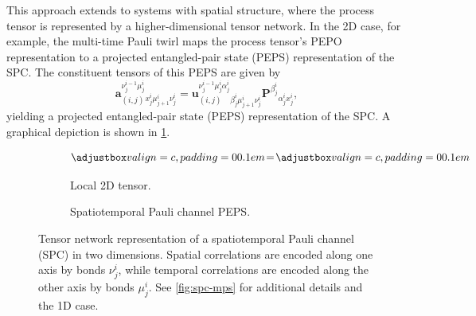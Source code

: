This approach extends to systems with spatial structure, where the process tensor is represented by a higher-dimensional tensor network. In the 2D case, for example, the multi-time Pauli twirl maps the process tensor's PEPO representation to a projected entangled-pair state (PEPS) representation of the SPC. The constituent tensors of this PEPS are given by
\begin{equation}
  \mathbf{a}_{(i, j)}^{\nu^{i-1}_j\mu_j^i}{}_{x_j^i\mu_{j+1}^i\nu_j^i} = 
  \mathbf{u}_{(i, j)}^{\nu^{i-1}_j\mu_j^i\alpha_j^i}{}_{\beta_j^i\mu_{j+1}^i\nu_j^i}
  \mathbf{P}^{\beta_j^i}{}_{\alpha_j^i x_j^i},
\end{equation}
yielding a projected entangled-pair state (PEPS) representation of the SPC. A graphical depiction is shown in \cref{fig:spc-peps}.
\begin{figure}
    \centering
    \begin{subfigure}{0.49\textwidth}
      \centering
      \[
      \valignbox{} 
      \!=\!
      \valignbox{}
      \]
      \caption{Local 2D tensor.}
    \end{subfigure}
    \begin{subfigure}{0.50\textwidth}
      \centering
      
      \caption{Spatiotemporal Pauli channel PEPS.}
    \end{subfigure}
    \caption{Tensor network representation of a spatiotemporal Pauli channel (SPC) in two dimensions. Spatial correlations are encoded along one axis by bonds \(\nu^i_j\), while temporal correlations are encoded along the other axis by bonds \(\mu^i_j\). See \cref{fig:spc-mps} for additional details and the 1D case.}
    \label{fig:spc-peps}
\end{figure}


